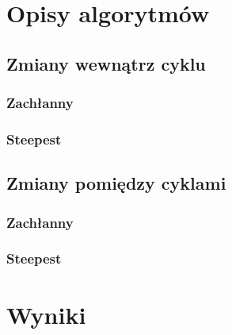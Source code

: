 \documentclass[11pt]{article}
\begin{document}
\section{Opisy algorytmów}\label{sec:opisy-alg}
\subsection{Zmiany wewnątrz cyklu}
\subsubsection{Zachłanny}


\subsubsection{Steepest}


\subsection{Zmiany pomiędzy cyklami}
\subsubsection{Zachłanny}


\subsubsection{Steepest}


\section{Wyniki}
\end{document}
